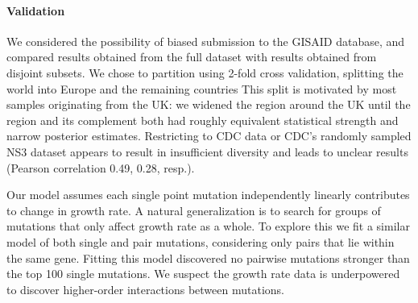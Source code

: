 \documentclass[12pt]{article}
\begin{document}
\paragraph*{Validation}

We considered the possibility of biased submission to the GISAID database, and compared results obtained from the full dataset with results obtained from disjoint subsets.
We chose to partition using 2-fold cross validation, splitting the world into Europe and the remaining countries
This split is motivated by most samples originating from the UK: we widened the region around the UK until the region and its complement both had roughly equivalent statistical strength and narrow posterior estimates.
Restricting to CDC data or CDC's randomly sampled NS3 dataset appears to result in insufficient diversity and leads to unclear results (Pearson correlation 0.49, 0.28, resp.).

Our model assumes each single point mutation independently linearly contributes to change in growth rate.
A natural generalization is to search for groups of mutations that only affect growth rate as a whole.
To explore this we fit a similar model of both single and pair mutations, considering only pairs that lie within the same gene.
Fitting this model discovered no pairwise mutations stronger than the top 100 single mutations.
We suspect the growth rate data is underpowered to discover higher-order interactions between mutations.




\end{document}
